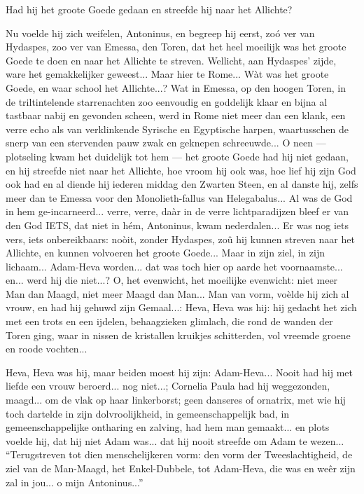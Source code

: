 \documentclass[a4paper, 12pt, oneside, dutch]{article}
\begin{document}
Had hij het groote Goede gedaan en streefde hij naar het Allichte?

Nu voelde hij zich weifelen, Antoninus, en begreep hij eerst, zoó ver van Hydaspes, zoo ver van Emessa, den Toren, dat het heel moeilijk was het groote Goede te doen en naar het Allichte te streven. Wellicht, aan Hydaspes' zijde, ware het gemakkelijker geweest... Maar hier te Rome... Wàt was het groote Goede, en waar school het Allichte...? Wat in Emessa, op den hoogen Toren, in de triltintelende starrenachten zoo eenvoudig en goddelijk klaar en bijna al tastbaar nabij en gevonden scheen, werd in Rome niet meer dan een klank, een verre echo als van verklinkende Syrische en Egyptische harpen, waartusschen de snerp van een stervenden pauw zwak en geknepen schreeuwde... O neen --- plotseling kwam het duidelijk tot hem --- het groote Goede had hij niet gedaan, en hij streefde niet naar het Allichte, hoe vroom hij ook was, hoe lief hij zijn God ook had en al diende hij iederen middag den Zwarten Steen, en al danste hij, zelfs meer dan te Emessa voor den Monolieth-fallus van Helegabalus... Al was de God in hem ge-incarneerd... verre, verre, daàr in de verre lichtparadijzen bleef er van den God IETS, dat niet in hém, Antoninus, kwam nederdalen... Er was nog iets vers, iets onbereikbaars: noòit, zonder Hydaspes, zoû hij kunnen streven naar het Allichte, en kunnen volvoeren het groote Goede... Maar in zijn ziel, in zijn lichaam... Adam-Heva worden... dat was toch hier op aarde het voornaamste... en... werd hij die niet...? O, het evenwicht, het moeilijke evenwicht: niet meer Man dan Maagd, niet meer Maagd dan Man... Man van vorm, voèlde hij zich al vrouw, en had hij gehuwd zijn Gemaal...: Heva, Heva was hij: hij gedacht het zich met een trots en een ijdelen, behaagzieken glimlach, die rond de wanden der Toren ging, waar in nissen de kristallen kruikjes schitterden, vol vreemde groene en roode vochten...

Heva, Heva was hij, maar beiden moest hij zijn: Adam-Heva... Nooit had hij met liefde een vrouw beroerd... nog niet...; Cornelia Paula had hij weggezonden, maagd... om de vlak op haar linkerborst; geen danseres of ornatrix, met wie hij toch dartelde in zijn dolvroolijkheid, in gemeenschappelijk bad, in gemeenschappelijke ontharing en zalving, had hem man gemaakt... en plots voelde hij, dat hij niet Adam was... dat hij nooit streefde om Adam te wezen... "`Terugstreven tot dien menschelijkeren vorm: den vorm der Tweeslachtigheid, de ziel van de Man-Maagd, het Enkel-Dubbele, tot Adam-Heva, die was en weêr zijn zal in jou... o mijn Antoninus..."'
\end{document}

